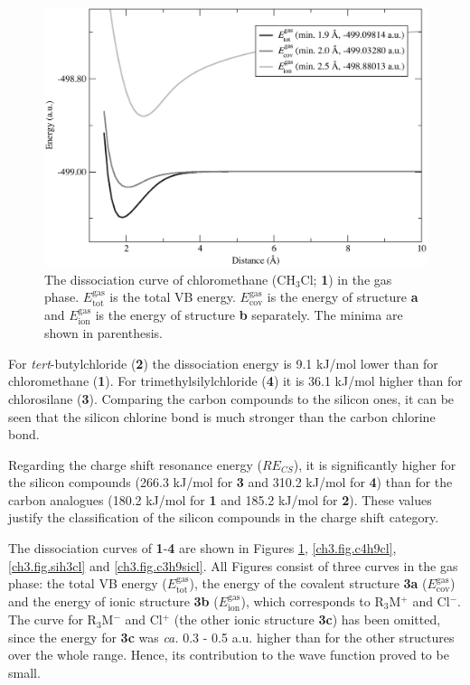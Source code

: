 \begin{figure}[H]
\begin{center}
\includegraphics[scale=0.55]{dissociation/figures/ch3cl_g.eps}
\end{center}
\caption{The dissociation curve of chloromethane (CH$_3$Cl; \textbf{1}) in the gas phase. $E_\mathrm{tot}^\mathrm{gas}$ is the total VB energy. $E_\mathrm{cov}^\mathrm{gas}$ is the energy of structure \textbf{a} and $E_\mathrm{ion}^\mathrm{gas}$ is the energy of structure \textbf{b} separately. The minima are shown in parenthesis.}
\label{ch3.fig.ch3cl}
\end{figure}

For \textit{tert}-butylchloride (\textbf{2}) the dissociation energy is 9.1 kJ/mol lower than for chloromethane (\textbf{1}). For trimethylsilylchloride (\textbf{4}) it is 36.1 kJ/mol higher than for chlorosilane (\textbf{3}). Comparing the carbon compounds to the silicon ones, it can be seen that the silicon chlorine bond is much stronger than the carbon chlorine bond.

Regarding the charge shift resonance energy ($RE_{CS}$), it is significantly higher for the silicon compounds (266.3 kJ/mol for \textbf{3} and 310.2 kJ/mol for \textbf{4}) than for the carbon analogues (180.2 kJ/mol for \textbf{1} and 185.2 kJ/mol for \textbf{2}). These values justify the classification of the silicon compounds in the charge shift category.

The dissociation curves of \textbf{1}-\textbf{4} are shown in Figures \ref{ch3.fig.ch3cl}, \ref{ch3.fig.c4h9cl}, \ref{ch3.fig.sih3cl} and \ref{ch3.fig.c3h9sicl}. All Figures consist of three curves in the gas phase: the total VB energy ($E_\mathrm{tot}^\mathrm{gas}$), the energy of the covalent structure \textbf{3a} ($E_\mathrm{cov}^\mathrm{gas}$) and the energy of ionic structure \textbf{3b} ($E_\mathrm{ion}^\mathrm{gas}$), which corresponds to R$_3$M$^{+}$ and Cl$^{-}$. The curve for R$_3$M$^{-}$ and Cl$^{+}$ (the other ionic structure \textbf{3c}) has been omitted, since the energy for \textbf{3c} was \textit{ca.} 0.3 - 0.5 a.u. higher than for the other structures over the whole range. Hence, its contribution to the wave function proved to be small.

